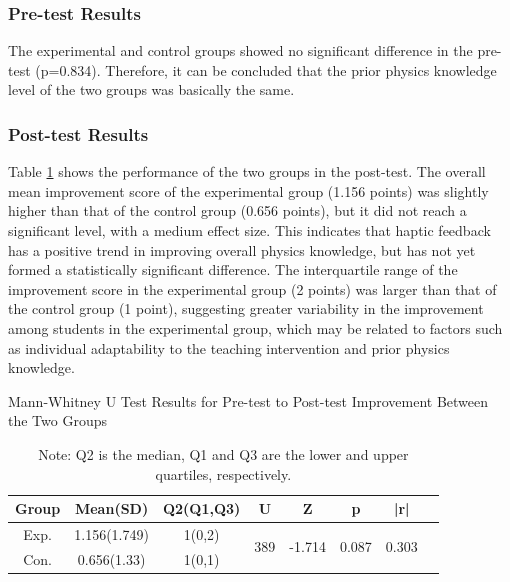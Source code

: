 \documentclass[runningheads]{llncs}
\begin{document}
\subsubsection{Pre-test Results}
The experimental and control groups showed no significant difference in the pre-test (p=0.834). Therefore, it can be concluded that the prior physics knowledge level of the two groups was basically the same.

\subsubsection{Post-test Results}
Table \ref{tab:learning-effect} shows the performance of the two groups in the post-test. The overall mean improvement score of the experimental group (1.156 points) was slightly higher than that of the control group (0.656 points), but it did not reach a significant level, with a medium effect size. This indicates that haptic feedback has a positive trend in improving overall physics knowledge, but has not yet formed a statistically significant difference. The interquartile range of the improvement score in the experimental group (2 points) was larger than that of the control group (1 point), suggesting greater variability in the improvement among students in the experimental group, which may be related to factors such as individual adaptability to the teaching intervention and prior physics knowledge.

\begin{table}[t]
\centering
\setlength{\tabcolsep}{10pt} %
\caption{Mann-Whitney U Test Results for Pre-test to Post-test Improvement Between the Two Groups}
\label{tab:learning-effect}
\begin{tabularx}{\textwidth}{cccccccc}
\toprule
\textbf{Group} & \textbf{Mean(SD)} & \textbf{Q2(Q1,Q3)} & \textbf{U} & \textbf{Z} & \textbf{p} & \textbf{|r|} \\
\midrule

Exp. & 1.156(1.749) & 1(0,2) & \multirow{2}{*}{389} & \multirow{2}{*}{-1.714} & \multirow{2}{*}{0.087} & \multirow{2}{*}{0.303} \\
Con. & 0.656(1.33) & 1(0,1) \\
\bottomrule
\end{tabularx}
\caption*{Note: Q2 is the median, Q1 and Q3 are the lower and upper quartiles, respectively.}
\end{table}
\end{document}
